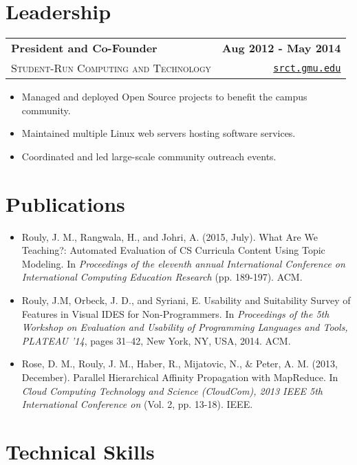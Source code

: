 \documentclass[letterpaper]{article}
\newenvironment{details}
{\begin{itemize}}
{\end{itemize}}
\begin{document}
  \section{Leadership}
  \noindent
  \begin{tabularx}{\textwidth}{@{}X r@{}}
    \textbf{President and Co-Founder} & \textbf{Aug 2012 - May 2014} \\
    \textsc{Student-Run Computing and Technology} & \texttt{\href{https://srct.gmu.edu}{srct.gmu.edu}}
  \end{tabularx}

  \begin{details}
  \item Managed and deployed Open Source projects to benefit the campus community.
  \item Maintained multiple Linux web servers hosting software services.
  \item Coordinated and led large-scale community outreach events.
  \end{details}


  \section{Publications}
  \noindent
  \begin{details}
  \item Rouly, J. M., Rangwala, H., and Johri, A. (2015, July). What Are We
  Teaching?: Automated Evaluation of CS Curricula Content Using Topic
  Modeling. In \emph{Proceedings of the eleventh annual International
  Conference on International Computing Education Research} (pp. 189-197). ACM.

  \item Rouly, J.M, Orbeck, J. D., and Syriani, E.
  Usability and Suitability Survey of Features in Visual IDES for
  Non-Programmers. In \emph{Proceedings of the 5th Workshop on Evaluation
  and Usability of Programming Languages and Tools, PLATEAU '14}, pages
  31–42, New York, NY, USA, 2014. ACM.

  \item Rose, D. M., Rouly, J. M., Haber, R., Mijatovic, N., \& Peter, A.
  M. (2013, December). Parallel Hierarchical Affinity Propagation with
  MapReduce. In \emph{Cloud Computing Technology and Science (CloudCom),
  2013 IEEE 5th International Conference on} (Vol. 2, pp. 13-18). IEEE.
  \end{details}


  \section{Technical Skills}
\end{document}
